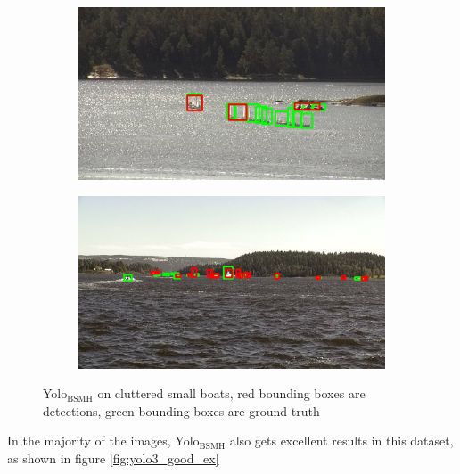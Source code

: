 \begin{figure}[h!]
\begin{subfigure}{.5\textwidth}
  \centering
  \includegraphics[width=0.8\linewidth]{discussion/clutter_yolo3/selected_08_10_frame0130.jpg}
\end{subfigure}%
\begin{subfigure}{.5\textwidth}
  \centering
  \includegraphics[width=.8\linewidth]{discussion/clutter_yolo3/selected_08_11_frame6630.jpg}
\end{subfigure}
\caption{Yolo$_{\text{BSMH}}$ on cluttered small boats, red bounding boxes are detections, green bounding boxes are ground truth}
\label{fig:yolo3_clutter}
\end{figure}

\newpage

In the majority of the images, Yolo$_{\text{BSMH}}$ also gets excellent results in this dataset, as shown in figure \ref{fig:yolo3_good_ex}

